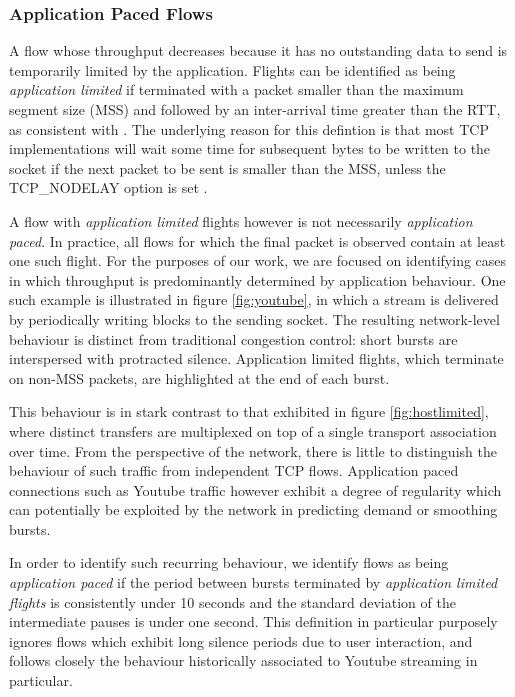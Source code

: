 \subsubsection{Application Paced Flows}
\label{sssec:app}

A flow whose throughput decreases because it has no outstanding data to send is temporarily limited by the application. 
Flights can be identified as being \emph{application limited} if terminated with a packet smaller than the maximum segment size (MSS) and followed by an inter-arrival time greater than the RTT, as consistent with \cite{Zhang:2002p85}. 
The underlying reason for this defintion is that most TCP implementations will wait some time for subsequent bytes to be written to the socket if the next packet to be sent is smaller than the MSS, unless the TCP\_NODELAY option is set \cite{nagle1984rfc}.

A flow with \emph{application limited} flights however is not necessarily \emph{application paced}. In practice, all flows for which the final packet is observed contain at least one such flight.
For the purposes of our work, we are focused on identifying cases in which throughput is predominantly determined by application behaviour.
One such example is illustrated in figure \ref{fig:youtube}, in which a stream is delivered by periodically writing blocks to the sending socket.
The resulting network-level behaviour is distinct from traditional congestion control: short bursts are interspersed with protracted silence.
Application limited flights, which terminate on non-MSS packets, are highlighted at the end of each burst.

This behaviour is in stark contrast to that exhibited in figure \ref{fig:hostlimited}, where distinct transfers are multiplexed on top of a single transport association over time.
From the perspective of the network, there is little to distinguish the behaviour of such traffic from independent TCP flows.
Application paced connections such as Youtube traffic however exhibit a degree of regularity which can potentially be exploited by the network in predicting demand or smoothing bursts.

In order to identify such recurring behaviour, we identify flows as being \emph{application paced} if the period between bursts terminated by \emph{application limited flights} is consistently under 10 seconds and the standard deviation of the intermediate pauses is under one second.
This definition in particular purposely ignores flows which exhibit long silence periods due to user interaction, and follows closely the behaviour historically associated to Youtube streaming in particular.

